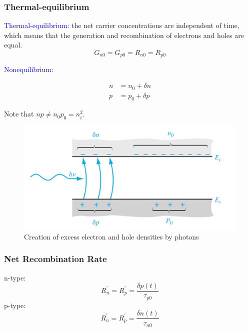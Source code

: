 \documentclass{beamer}
\begin{document}
    \begin{frame} \frametitle{Thermal-equilibrium}
        \textcolor{blue}{Thermal-equilibrium}: the net carrier concentrations are independent of time, which means that the generation and recombination of electrons and holes are equal.
        \begin{equation*}
            G_{n0} = G_{p0} = R_{n0} = R_{p0}
        \end{equation*}

        \textcolor{blue}{Nonequilibrium}: 
        
        \begin{minipage}{\linewidth}
            \begin{minipage}{0.5\linewidth}
                \begin{equation*}
                    \begin{aligned}
                        n &= n_0 + \delta n \\
                        p &= p_0 + \delta p
                    \end{aligned}
                \end{equation*}
                \par Note that $np \neq n_0 p_0 = n_i^2$.
            \end{minipage}
            \begin{minipage}{0.49\linewidth}
                \begin{figure}[H]
                    \centering
                    \includegraphics[width=\linewidth]{Photons-generation.jpg}
                    \caption{Creation of excess electron and hole densities by photons}
                    \label{fig:Photons-generation.jpg}
                \end{figure}
            \end{minipage}
        \end{minipage}
    \end{frame}
    \begin{frame} \frametitle{Net Recombination Rate}
        n-type:
        \begin{equation*}
            R^\prime_n = R^\prime_p = \frac{\delta p(t)}{\tau_{p0}}
        \end{equation*}
        p-type:
        \begin{equation*}
            R^\prime_n = R^\prime_p = \frac{\delta n(t)}{\tau_{n0}} 
        \end{equation*}
    \end{frame}
\end{document}
